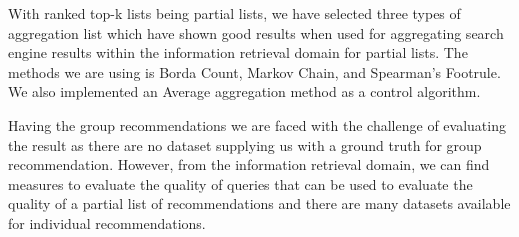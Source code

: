 With ranked top-k lists being partial lists, we have selected three types of aggregation list which have shown good results when used for aggregating search engine results within the information retrieval domain for partial lists. The methods we are using is Borda Count, Markov Chain, and Spearman's Footrule\cite{Masthoff2004, rank:aggregation}. We also implemented an Average aggregation method as a control algorithm.

Having the group recommendations we are faced with the challenge of evaluating the result as there are no dataset supplying us with a ground truth for group recommendation. However, from the information retrieval domain, we can find measures to evaluate the quality of queries that can be used to evaluate the quality of a partial list of recommendations and there are many datasets available for individual recommendations.







